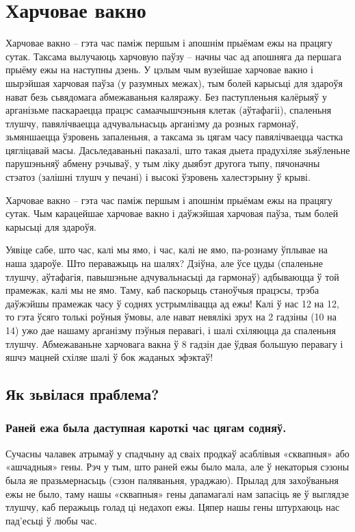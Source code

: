 \chapter{Харчовае вакно}

Харчовае вакно – гэта час паміж першым і апошнім прыёмам ежы на працягу сутак. Таксама вылучаюць харчовую паўзу – начны час ад апошняга да першага прыёму ежы на наступны дзень. У цэлым чым вузейшае харчовае вакно і шырэйшая харчовая паўза (у разумных межах), тым болей карысьці для здароўя нават безь сьвядомага абмежаваньня каляражу. Без паступленьня калёрыяў у арганізьме паскараецца працэс самаачышчэньня клетак (аўтафагіі), спаленьня тлушчу, павялічваецца адчувальнасьць арганізму да розных гармонаў, зьмяншаецца ўзровень запаленьня, а таксама зь цягам часу павялічваецца частка цягліцавай масы. Дасьледаваньні паказалі, што такая дыета прадухіляе зьяўленьне парушэньняў абмену рэчываў, у тым ліку дыябэт другога тыпу, пячоначны стэатоз (залішні тлушч у печані) і высокі ўзровень халестэрыну ў крыві.

Харчовае вакно – гэта час паміж першым і апошнім прыёмам ежы на працягу сутак. Чым карацейшае харчовае вакно і даўжэйшая харчовая паўза, тым болей карысьці для здароўя.

Уявіце сабе, што час, калі мы ямо, і час, калі не ямо, па-рознаму ўплывае на наша здароўе. Што пераважыць на шалях? Дзіўна, але ўсе цуды (спаленьне тлушчу, аўтафагія, павышэньне адчувальнасьці да гармонаў) адбываюцца ў той прамежак, калі мы не ямо. Таму, каб паскорыць станоўчыя працэсы, трэба даўжэйшы прамежак часу ў соднях устрымлівацца ад ежы! Калі ў нас 12 на 12, то гэта ўсяго толькі роўныя ўмовы, але нават невялікі зрух на 2 гадзіны (10 на 14) ужо дае нашаму арганізму пэўныя перавагі, і шалі схіляюцца да спаленьня тлушчу. Абмежаваньне харчовага вакна ў 8 гадзін дае ўдвая большую перавагу і яшчэ мацней схіляе шалі ў бок жаданых эфэктаў!

\section{Як зьвілася праблема?}

\subsection{Раней ежа была даступная кароткі час цягам содняў.}
Сучасны чалавек атрымаў у спадчыну ад сваіх продкаў асаблівыя «сквапныя» або «ашчадныя» гены. Рэч у тым, што раней ежы было мала, але ў некаторыя сэзоны была яе празьмернасьць (сэзон паляваньня, ураджаю). Прылад для захоўваньня ежы не было, таму нашы «сквапныя» гены дапамагалі нам запасіць яе ў выглядзе тлушчу, каб перажыць голад ці недахоп ежы. Цяпер нашы гены штурхаюць нас пад'есьці ў любы час.

